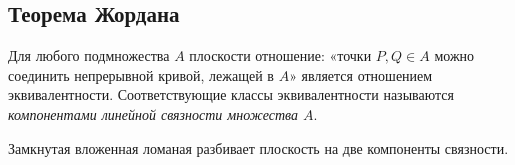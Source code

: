 \subsection{Теорема Жордана}
\begin{definition}
    Для любого подмножества $A$ плоскости отношение: «точки $P,Q \in A$ можно соединить непрерывной кривой, лежащей в $A$» является отношением эквивалентности. Соответствующие классы эквивалентности называются \textit{компонентами линейной связности множества $A$}.
\end{definition}

\begin{theorem}
    Замкнутая вложенная ломаная разбивает плоскость на две компоненты связности. %
\end{theorem}
